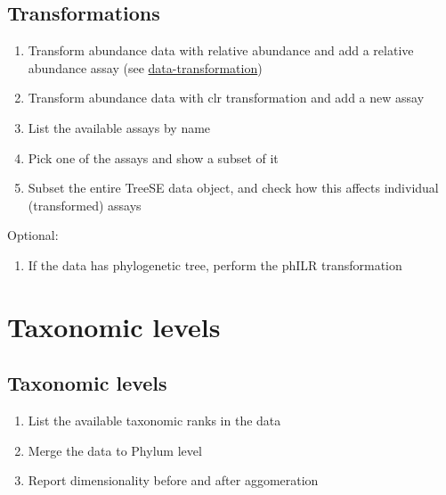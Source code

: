 \documentclass[
]{book}
\providecommand{\tightlist}{%
  \setlength{\itemsep}{0pt}\setlength{\parskip}{0pt}}
\begin{document}
\hypertarget{transformations-1}{%
\subsection{Transformations}\label{transformations-1}}

\begin{enumerate}
\def\labelenumi{\arabic{enumi}.}
\tightlist
\item
  Transform abundance data with relative abundance and add a relative abundance assay (see \href{https://microbiome.github.io/OMA/taxonomic-information.html\#data-transformation}{data-transformation})
\item
  Transform abundance data with clr transformation and add a new assay
\item
  List the available assays by name
\item
  Pick one of the assays and show a subset of it
\item
  Subset the entire TreeSE data object, and check how this affects individual (transformed) assays
\end{enumerate}

Optional:

\begin{enumerate}
\def\labelenumi{\arabic{enumi}.}
\setcounter{enumi}{5}
\tightlist
\item
  If the data has phylogenetic tree, perform the phILR transformation
\end{enumerate}

\hypertarget{taxonomic-levels}{%
\section{Taxonomic levels}\label{taxonomic-levels}}

\hypertarget{taxonomic-levels-1}{%
\subsection{Taxonomic levels}\label{taxonomic-levels-1}}

\begin{enumerate}
\def\labelenumi{\arabic{enumi}.}
\tightlist
\item
  List the available taxonomic ranks in the data
\item
  Merge the data to Phylum level
\item
  Report dimensionality before and after aggomeration
\end{enumerate}
\end{document}
